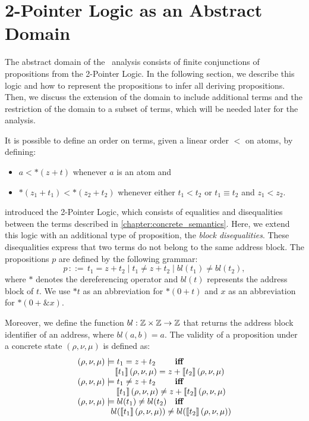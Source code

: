 \chapter{2-Pointer Logic as an Abstract Domain}\label{chapter:2pointer}

The abstract domain of the \cpo\ analysis consists of finite conjunctions of propositions from the 2-Pointer Logic.
In the following section, we describe this logic and how to represent the propositions to infer all deriving propositions.
Then, we discuss the extension of the domain to include additional terms and the restriction of the domain to a subset of terms, which will be needed later for the analysis.


It is possible to define an order on terms, given a linear order $<$ on atoms, by defining:
\begin{itemize}
  \item $a < *(z+t)$ whenever $a$ is an atom and
  \item $*(z_1 + t_1) < *(z_2 + t_2)$ whenever either $t_1 < t_2$ or $t_1 \equiv t_2$ and $z_1 < z_2$.
\end{itemize}

\textcite{2pointer} introduced the 2-Pointer Logic, which consists of equalities and disequalities between the terms described in \cref{chapter:concrete_semantics}.
Here, we extend this logic with an additional type of proposition, the \emph{block disequalities}.
These disequalities express that two terms do not belong to the same address block.
The propositions $p$ are defined by the following grammar:
\[
  p\,{::=}\,t_1=z+t_2 \mid t_1\neq z+t_2\mid bl(t_1) \neq bl(t_2),
\]
where $*$ denotes the dereferencing operator and $bl(t)$ represents the address block of $t$.
We use $*t$ as an abbreviation for $*(0+t)$ and $x$ as an abbreviation for $*(0+\&x)$.

Moreover, we define the function $bl : \mathbb{Z} \times \mathbb{Z} \rightarrow \mathbb{Z}$ that returns the address block identifier of an address, where $bl(a,b) = a$.
The validity of a proposition under a concrete state $(\rho,\nu,\mu)$ is defined as:
\[
  \begin{array}{ll}
    (\rho,\nu,\mu)\models t_1 = z+t_2          & \textbf{iff}
    \\ \multicolumn{2}{c}{\quad\quad\quad\quad\sem{t_1}\,(\rho,\nu,\mu) = z+\sem{t_2}\,(\rho,\nu,\mu)}  \\
    (\rho,\nu,\mu)\models t_1 \neq z+t_2       & \textbf{iff}
    \\ \multicolumn{2}{c}{\quad\quad\quad\quad\sem{t_1}\,(\rho,\nu,\mu) \neq z+\sem{t_2}\,(\rho,\nu,\mu)} \\
    (\rho,\nu,\mu)\models bl(t_1) \neq bl(t_2) & \textbf{iff}
    \\ \multicolumn{2}{c}{\quad\quad\quad\quad bl(\sem{t_1}\,(\rho, \nu, \mu)) \neq bl(\sem{t_2}\,(\rho, \nu, \mu))}
  \end{array}
\]


